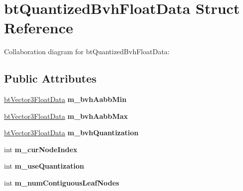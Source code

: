 \hypertarget{structbt_quantized_bvh_float_data}{\section{bt\+Quantized\+Bvh\+Float\+Data Struct Reference}
\label{structbt_quantized_bvh_float_data}
}


Collaboration diagram for bt\+Quantized\+Bvh\+Float\+Data\+:
\subsection*{Public Attributes}
\begin{DoxyCompactItemize}
\item 
\hypertarget{structbt_quantized_bvh_float_data_a32a0799ac502d8ce7752ff3df7c22e9e}{\hyperlink{structbt_vector3_float_data}{bt\+Vector3\+Float\+Data} {\bfseries m\+\_\+bvh\+Aabb\+Min}}\label{structbt_quantized_bvh_float_data_a32a0799ac502d8ce7752ff3df7c22e9e}

\item 
\hypertarget{structbt_quantized_bvh_float_data_add30eea3c705a49af6590f15fa0881d8}{\hyperlink{structbt_vector3_float_data}{bt\+Vector3\+Float\+Data} {\bfseries m\+\_\+bvh\+Aabb\+Max}}\label{structbt_quantized_bvh_float_data_add30eea3c705a49af6590f15fa0881d8}

\item 
\hypertarget{structbt_quantized_bvh_float_data_aaab5b74a8072e63156dccf909e44fdad}{\hyperlink{structbt_vector3_float_data}{bt\+Vector3\+Float\+Data} {\bfseries m\+\_\+bvh\+Quantization}}\label{structbt_quantized_bvh_float_data_aaab5b74a8072e63156dccf909e44fdad}

\item 
\hypertarget{structbt_quantized_bvh_float_data_a1bfc127a4ca593443aed5b2fdbfc1db9}{int {\bfseries m\+\_\+cur\+Node\+Index}}\label{structbt_quantized_bvh_float_data_a1bfc127a4ca593443aed5b2fdbfc1db9}

\item 
\hypertarget{structbt_quantized_bvh_float_data_a7b81e5922d4f587a4c4747339111d301}{int {\bfseries m\+\_\+use\+Quantization}}\label{structbt_quantized_bvh_float_data_a7b81e5922d4f587a4c4747339111d301}

\item 
\hypertarget{structbt_quantized_bvh_float_data_a9a3ba292837f9240e488b48edfa7c581}{int {\bfseries m\+\_\+num\+Contiguous\+Leaf\+Nodes}}\label{structbt_quantized_bvh_float_data_a9a3ba292837f9240e488b48edfa7c581}


\end{DoxyCompactItemize}
